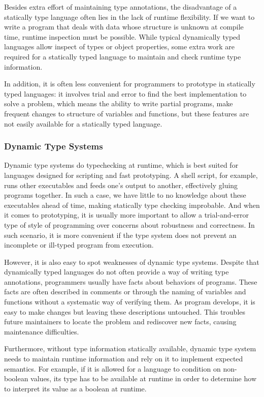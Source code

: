 Besides extra effort of maintaining type annotations,
the disadvantage of a statically type language often lies in the lack of runtime flexibility.
If we want to write a program that deals with data whose structure is
unknown at compile time, runtime inspection must be possible.
While typical dynamically typed languages allow inspect of types or object properties,
some extra work are required for a statically typed language
to maintain and check runtime type information.

In addition, it is often less convenient for programmers to prototype
in statically typed languages: it involves trial and error to find the best implementation
to solve a problem, which means the ability to write partial programs,
make frequent changes to structure of variables and functions, but these features are not easily available for a statically typed language.

\subsubsection{Dynamic Type Systems}

Dynamic type systems do typechecking at runtime, which is best suited for
languages designed for scripting and fast prototyping.
A shell script, for example, runs other executables and feeds one's output to another,
effectively gluing programs together.
In such a case, we have little to no knowledge about these executables ahead of time,
making statically type checking improbable.
And when it comes to prototyping,
it is usually more important to allow a trial-and-error type of style of programming
over concerns about robustness and correctness.
In such scenario, it is more convenient if the type system does not prevent
an incomplete or ill-typed program from execution.

However, it is also easy to spot weaknesses of dynamic type systems.
Despite that dynamically typed languages do not often provide a way of writing type annotations,
programmers usually have facts about behaviors of programs.
These facts are often described in comments or through the naming of variables and functions without a systematic way of verifying them.
As program develops, it is easy to make changes but leaving these descriptions untouched.
This troubles future maintainers to locate the problem and rediscover new facts,
causing maintenance difficulties.

Furthermore, without type information statically available,
dynamic type system needs to maintain runtime information
and rely on it to implement expected semantics.
For example, if it is allowed for a language to condition on non-boolean values,
its type has to be available at runtime in order to
determine how to interpret its value as a boolean at runtime.

